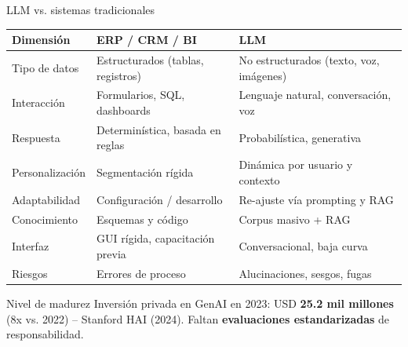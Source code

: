 \documentclass[10pt,aspectratio=169]{beamer}
\begin{document}
\begin{frame}{LLM vs. sistemas tradicionales}
    \begin{center}
    \small
    \begin{tabular}{p{3.3cm} p{4.8cm} p{4.8cm}}
        \toprule
        \textbf{Dimensión} & \textbf{ERP / CRM / BI} & \textbf{LLM} \\
        \midrule
        Tipo de datos & Estructurados (tablas, registros) & No estructurados (texto, voz, imágenes) \\
        Interacción & Formularios, SQL, dashboards & Lenguaje natural, conversación, voz \\
        Respuesta & Determinística, basada en reglas & Probabilística, generativa \\
        Personalización & Segmentación rígida & Dinámica por usuario y contexto \\
        Adaptabilidad & Configuración / desarrollo & Re-ajuste vía prompting y RAG \\
        Conocimiento & Esquemas y código & Corpus masivo + RAG \\
        Interfaz & GUI rígida, capacitación previa & Conversacional, baja curva \\
        Riesgos & Errores de proceso & Alucinaciones, sesgos, fugas \\
        \bottomrule
    \end{tabular}
    \end{center}
    \vspace{0.3cm}
    \begin{alertblock}{Nivel de madurez}
        \centering Inversión privada en GenAI en 2023: USD \textbf{25.2 mil millones} (8x vs. 2022) -- Stanford HAI (2024). Faltan \textbf{evaluaciones estandarizadas} de responsabilidad.
    \end{alertblock}
\end{frame}

\end{document}
